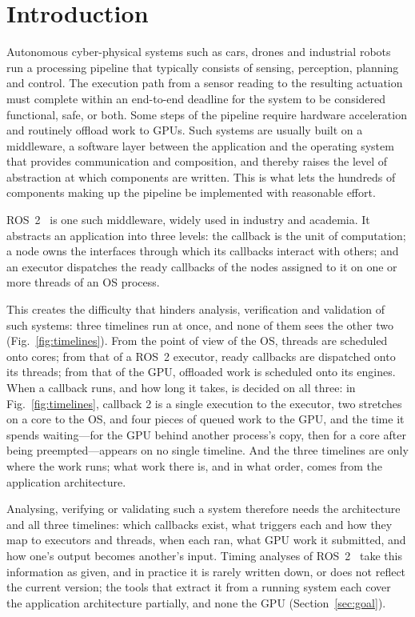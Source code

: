\section{Introduction}
\label{sec:intro}
Autonomous cyber-physical systems such as cars, drones and industrial robots run a processing pipeline that typically consists of sensing, perception, planning and control. The execution path from a sensor reading to the resulting actuation must complete within an end-to-end deadline for the system to be considered functional, safe, or both. Some steps of the pipeline require hardware acceleration and routinely offload work to GPUs. Such systems are usually built on a middleware, a software layer between the application and the operating system that provides communication and composition, and thereby raises the level of abstraction at which components are written. This is what lets the hundreds of components making up the pipeline be implemented with reasonable effort.

ROS~2~\cite{ros2-standard} is one such middleware, widely used in industry and academia. It abstracts an application into three levels: the callback is the unit of computation; a node owns the interfaces through which its callbacks interact with others; and an executor dispatches the ready callbacks of the nodes assigned to it on one or more threads of an OS process.

This creates the difficulty that hinders analysis, verification and validation of such systems: three timelines run at once, and none of them sees the other two (Fig.~\ref{fig:timelines}). From the point of view of the OS, threads are scheduled onto cores; from that of a ROS~2 executor, ready callbacks are dispatched onto its threads; from that of the GPU, offloaded work is scheduled onto its engines. When a callback runs, and how long it takes, is decided on all three: in Fig.~\ref{fig:timelines}, callback 2 is a single execution to the executor, two stretches on a core to the OS, and four pieces of queued work to the GPU, and the time it spends waiting---for the GPU behind another process's copy, then for a core after being preempted---appears on no single timeline. And the three timelines are only where the work runs; what work there is, and in what order, comes from the application architecture.

Analysing, verifying or validating such a system therefore needs the architecture and all three timelines: which callbacks exist, what triggers each and how they map to executors and threads, when each ran, what GPU work it submitted, and how one's output becomes another's input. Timing analyses of ROS~2~\cite{casini-19-reservationbased,arafat-2026-mtexecutor-cbgroups,teper-2024-end2endmtexecutoranalysisoptimization} take this information as given, and in practice it is rarely written down, or does not reflect the current version; the tools that extract it from a running system each cover the application architecture partially, and none the GPU (Section~\ref{sec:goal}).

